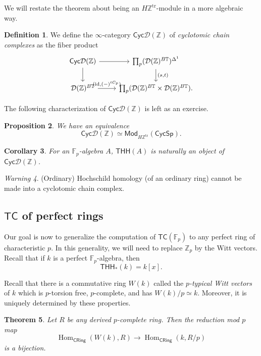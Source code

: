 \documentclass[10pt, oneside]{memoir}
\newtheorem{thm}{Theorem}[subsection]
\newtheorem{cor}[thm]{Corollary}
\newtheorem{prop}[thm]{Proposition}
\theoremstyle{definition}
\newtheorem{defn}[thm]{Definition}
\theoremstyle{remark}
\newtheorem{warn}[thm]{Warning}
\theoremstyle{plain}
\theoremstyle{definition}
\theoremstyle{remark}
\newcommand{\Z}{\mathbb{Z}}
\newcommand{\F}{\mathbb{F}}
\newcommand{\mc}[1]{\mathcal{#1}}
\newcommand{\T}{\mathbb{T}}
\newcommand{\mr}[1]{\mathrm{#1}}
\newcommand{\ms}[1]{\mathsf{#1}}
\newcommand{\1}{\mathbf{1}}
\newcommand{\2}{\mathbf{2}}
\newcommand{\3}{\mathbf{3}}
\newcommand{\THH}{\ms{THH}}
\newcommand{\TC}{\ms{TC}}
\DeclareMathOperator{\Hom}{Hom}
\begin{document}
We will restate the theorem about being an $H\Z^{\mr{tr}}$-module in a more algebraic way.

\begin{defn}
    We define the $\infty$-category $\ms{Cyc}\mc{D}(\Z)$ of \textit{cyclotomic chain complexes} as the fiber product
    \begin{equation*}
    \begin{tikzcd}
        \ms{Cyc}\mc{D}(\Z) \ar{r} \ar{d} & \prod_p (\mc{D}(\Z)^{B\T})^{\Delta^1} \ar{d}{(s, t)} \\
        \mc{D}(\Z)^{B\T} \ar{r}{(\mr{id}, (-)^{tC_p})} & \prod_p (\mc{D}(\Z)^{B\T} \times \mc{D}(\Z)^{B\T}).
    \end{tikzcd}
    \end{equation*}
\end{defn}

The following characterization of $\ms{Cyc}\mc{D}(\Z)$ is left as an exercise.
\begin{prop}
    We have an equivalence
    \[ \ms{Cyc}\mc{D}(\Z) \simeq \ms{Mod}_{H\Z^{\mr{tr}}} (\ms{CycSp}). \]
\end{prop}

\begin{cor}
    For an $\F_p$-algebra $A$, $\THH(A)$ is naturally an object of $\ms{Cyc}\mc{D}(\Z)$.
\end{cor}

\begin{warn}
    (Ordinary) Hochschild homology (of an ordinary ring) cannot be made into a cyclotomic chain complex.
\end{warn}



\subsection{$\TC$ of perfect rings}%
\label{sub:TC of perfect rings}

Our goal is now to generalize the computation of $\TC(\F_p)$ to any perfect ring of characteristic $p$. In this generality, we will need to replace $\Z_p$ by the Witt vectors. Recall that if $k$ is a perfect $\F_p$-algebra, then
\[ \THH_*(k) = k[x]. \]

Recall that there is a commutative ring $W(k)$ called the \textit{$p$-typical Witt vectors} of $k$ which is $p$-torsion free, $p$-complete, and has $W(k)/p \simeq k$. Moreover, it is uniquely determined by these properties.

\begin{thm}
    Let $R$ be any derived $p$-complete ring. Then the reduction mod $p$ map
    \[ \Hom_{\ms{CRing}}(W(k), R) \to \Hom_{\ms{CRing}}(k, R/p) \]
    is a bijection.
\end{thm}
\end{document}
